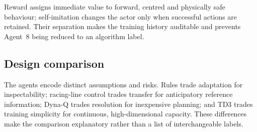 Reward assigns immediate value to forward, centred and physically safe behaviour; self-imitation changes the actor only when successful actions are retained. Their separation makes the training history auditable and prevents Agent~8 being reduced to an algorithm label.

\subsection{Design comparison}

The agents encode distinct assumptions and risks. Rules trade adaptation for inspectability; racing-line control trades transfer for anticipatory reference information; Dyna-Q trades resolution for inexpensive planning; and TD3 trades training simplicity for continuous, high-dimensional capacity. These differences make the comparison explanatory rather than a list of interchangeable labels.
